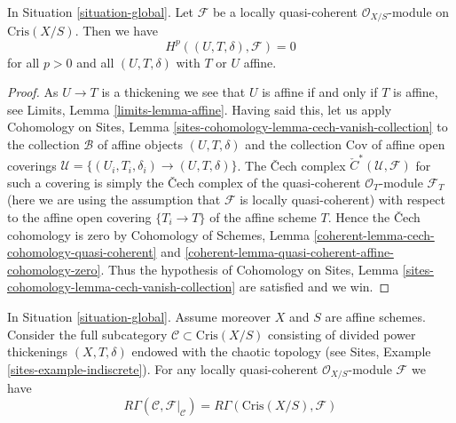 \begin{lemma}
\label{lemma-vanishing-lqc}
In Situation \ref{situation-global}.
Let $\mathcal{F}$ be a locally quasi-coherent $\mathcal{O}_{X/S}$-module
on $\text{Cris}(X/S)$. Then we have
$$
H^p((U, T, \delta), \mathcal{F}) = 0
$$
for all $p > 0$ and all $(U, T, \delta)$ with $T$ or $U$ affine.
\end{lemma}

\begin{proof}
As $U \to T$ is a thickening we see that $U$ is affine if and only if $T$
is affine, see Limits, Lemma \ref{limits-lemma-affine}.
Having said this, let us apply
Cohomology on Sites, Lemma \ref{sites-cohomology-lemma-cech-vanish-collection}
to the collection $\mathcal{B}$ of affine objects $(U, T, \delta)$ and the
collection $\text{Cov}$ of affine open coverings
$\mathcal{U} = \{(U_i, T_i, \delta_i) \to (U, T, \delta)\}$. The
{\v C}ech complex
${\check C}^*(\mathcal{U}, \mathcal{F})$ for such a covering is simply
the {\v C}ech complex of the quasi-coherent $\mathcal{O}_T$-module
$\mathcal{F}_T$
(here we are using the assumption that $\mathcal{F}$ is locally quasi-coherent)
with respect to the affine open covering $\{T_i \to T\}$ of the
affine scheme $T$. Hence the {\v C}ech cohomology is zero by
Cohomology of Schemes, Lemma
\ref{coherent-lemma-cech-cohomology-quasi-coherent} and
\ref{coherent-lemma-quasi-coherent-affine-cohomology-zero}.
Thus the hypothesis of
Cohomology on Sites, Lemma \ref{sites-cohomology-lemma-cech-vanish-collection}
are satisfied and we win.
\end{proof}

\begin{lemma}
\label{lemma-compare}
In Situation \ref{situation-global}.
Assume moreover $X$ and $S$ are affine schemes.
Consider the full subcategory $\mathcal{C} \subset \text{Cris}(X/S)$
consisting of divided power thickenings $(X, T, \delta)$
endowed with the chaotic topology (see
Sites, Example \ref{sites-example-indiscrete}).
For any locally quasi-coherent $\mathcal{O}_{X/S}$-module $\mathcal{F}$
we have
$$
R\Gamma(\mathcal{C}, \mathcal{F}|_\mathcal{C}) =
R\Gamma(\text{Cris}(X/S), \mathcal{F})
$$
\end{lemma}

